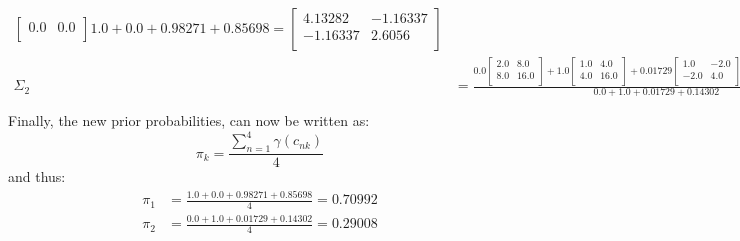 \documentclass{exam}
\begin{document}
\begin{questions}
\begin{itemize}
\begin{align*}
{\begin{bmatrix}
                    0.0 & 0.0 \\
                \end{bmatrix}
                }{1.0 + 0.0 + 0.98271 + 0.85698} = 
                \begin{bmatrix}
                    4.13282 & -1.16337 \\
                    -1.16337 & 2.6056 \\
                \end{bmatrix}\\
                \Sigma_2 &= \frac{0.0
                \begin{bmatrix}
                    2.0 & 8.0 \\
                    8.0 & 16.0 \\
                \end{bmatrix} + 1.0
                \begin{bmatrix}
                    1.0 & 4.0 \\
                    4.0 & 16.0 \\
                \end{bmatrix} + 0.01729
                \begin{bmatrix}
                    1.0 & -2.0 \\
                    -2.0 & 4.0 \\
                \end{bmatrix} + 0.14302
                \begin{bmatrix}
                    4.0 & 0.0 \\
                    0.0 & 0.0 \\
                \end{bmatrix}
                }{0.0 + 1.0 + 0.01729 + 0.14302} = 
                \begin{bmatrix}
                    2.70166 & 2.10624 \\
                    2.10624 & 2.16924 \\
                \end{bmatrix}
            \end{align*}
            Finally, the new prior probabilities, can now be written as:
            \[
                \pi_k = \frac{\sum_{n = 1}^{4}\gamma(c_{nk})}{4}
            \] 
            and thus:
            \begin{align*}
                \pi_1 &= \frac{1.0 + 0.0 + 0.98271 + 0.85698}{4} = 0.70992 \\
                \pi_2 &= \frac{0.0 + 1.0 + 0.01729 + 0.14302}{4} = 0.29008 \\

\end{align*}
\end{itemize}
\end{questions}
\end{document}

